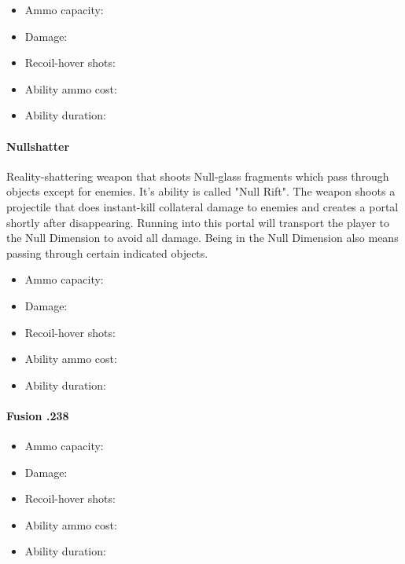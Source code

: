 \documentclass[../Main.tex]{subfiles}
\begin{document}
\begin{itemize}
	\item Ammo capacity: 
	\item Damage: 
	\item Recoil-hover shots: 
	\item Ability ammo cost: 
	\item Ability duration: 
\end{itemize}


\paragraph{Nullshatter}

Reality-shattering weapon that shoots Null-glass fragments which pass through objects except for enemies. It's ability is called "Null Rift". The weapon shoots a projectile that does instant-kill collateral damage to enemies and creates a portal shortly after disappearing. Running into this portal will transport the player to the Null Dimension to avoid all damage. Being in the Null Dimension also means passing through certain indicated objects. 

\begin{itemize}
	\item Ammo capacity: 
	\item Damage: 
	\item Recoil-hover shots: 
	\item Ability ammo cost: 
	\item Ability duration: 
\end{itemize}

\paragraph{Fusion .238}

\begin{itemize}
	\item Ammo capacity: 
	\item Damage: 
	\item Recoil-hover shots: 
	\item Ability ammo cost: 
	\item Ability duration: 
\end{itemize}
\end{document}
